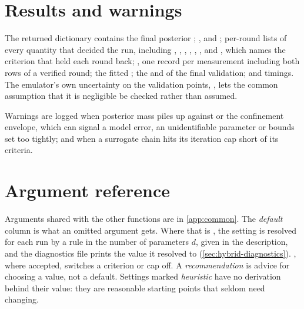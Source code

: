 \section{Results and warnings}

The returned dictionary contains the final posterior ; ,
 and ; per-round lists of every quantity that decided the
run, including , ,
,
, , ,
 and , which names the criterion that held
each round back; , one record per measurement including both rows of a verified
round; the fitted ; the  and 
of the final validation; and timings. The emulator's own uncertainty on the validation points,
, lets the common assumption that it is negligible be checked rather
than assumed.

Warnings are logged when posterior mass piles up against  or the confinement envelope, which can signal a
model error, an unidentifiable parameter or bounds set too tightly; and when a surrogate chain hits its
iteration cap short of its criteria.

\section{Argument reference}
\label{sec:hybrid-args}

Arguments shared with the other functions are in \cref{app:common}. The \emph{default} column is
what an omitted argument gets. Where that is , the setting is resolved for each run by a
rule in the number of parameters $d$, given in the description, and the diagnostics file prints
the value it resolved to (\cref{sec:hybrid-diagnostics}). , where accepted, switches a
criterion or cap off. A \emph{recommendation} is advice for choosing a value, not a default. Settings
marked \emph{heuristic} have no derivation behind their value: they are reasonable starting points
that seldom need changing.

